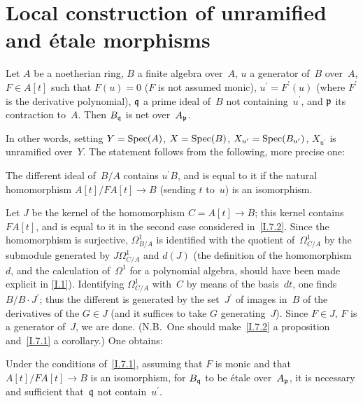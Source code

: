 \section{Local construction of unramified and \'etale morphisms}
\label{I.7}

\begin{proposition}
\label{I.7.1}
Let $A$ be a noetherian ring, $B$ a finite algebra over~$A$,
$u$ a generator of~$B$ over~$A$, $F\in A[t]$ such that $F(u)=0$
($F$ is not assumed monic), $u^\prime=F^\prime(u)$ (where
$F^\prime$ is the derivative polynomial), $\mathfrak{q}$ a prime
ideal of~$B$ not containing~$u^\prime$, and $\mathfrak{p}$ its
contraction to~$A$. Then $B_\mathfrak{q}$ is net over~$A_\mathfrak{p}$.
\end{proposition}

In other words, setting $Y=\operatorname{Spec}(A)$, $X=\operatorname{Spec}(B)$,
$X_{u^\prime}=\operatorname{Spec}(B_{u^\prime})$, $X_{u^\prime}$ is unramified
over~$Y$. The statement follows from the following, more precise one:

\begin{corollary}
\label{I.7.2}
The different ideal of~$B/A$ contains $u^\prime B$, and is equal
to it if the natural homomorphism $A[t]/FA[t]\to B$ (sending
$t$ to~$u$) is an isomorphism.
\end{corollary}

Let $J$ be the kernel of the homomorphism $C=A[t]\to B$; this
kernel contains $FA[t]$, and is equal to it in the second case
considered in~\ref{I.7.2}. Since the homomorphism is surjective,
$\Omega^1_{B/A}$ is identified with the quotient of~$\Omega^1_{C/A}$
by the submodule generated by $J\Omega^1_{C/A}$ and $d(J)$
(the definition of the homomorphism~$d$, and the calculation
of~$\Omega^1$ for a polynomial algebra, should have been made
explicit in \No\ref{I.1}). Identifying $\Omega^1_{C/A}$ with~$C$
by means of the basis~$dt$, one finds $B/B\cdot J^\prime$;
thus the different is generated by the set~$J^\prime$ of images
in~$B$ of the derivatives of the $G\in J$ (and it suffices to
take $G$ generating~$J$). Since $F\in J$, \resp $F$ is a generator
of~$J$, we are done. (N.B.\ One should make~\ref{I.7.2} a
proposition and~\ref{I.7.1} a corollary.) One obtains:

\begin{corollary}
\label{I.7.3}
Under the conditions of~\ref{I.7.1}, assuming that $F$ is monic
and that $A[t]/FA[t]\to B$ is an isomorphism, for $B_\mathfrak{q}$
to be \'etale over~$A_\mathfrak{p}$, it is necessary and sufficient
that~$\mathfrak{q}$ not contain~$u^\prime$.
\end{corollary}

